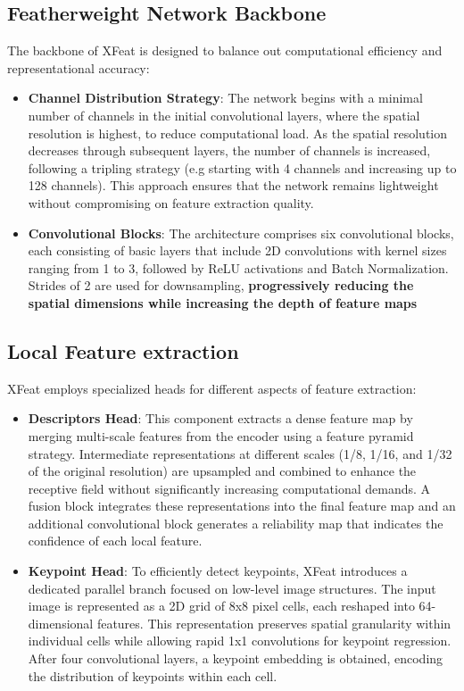 \subsection{Featherweight Network Backbone}
The backbone of XFeat is designed to balance out computational efficiency and
representational accuracy:
\begin{itemize}
    \item \textbf{Channel Distribution Strategy}: The network begins with a minimal number of channels in the initial convolutional layers, where the spatial resolution is highest, to reduce computational load. As the spatial resolution decreases through subsequent layers, the number of channels is increased, following a tripling strategy (e.g starting with 4 channels and increasing up to 128 channels). This approach ensures that the network remains lightweight without compromising on feature extraction quality.
    \item \textbf{Convolutional Blocks}: The architecture comprises six convolutional blocks, each consisting of basic layers that include 2D convolutions  with kernel sizes ranging from 1 to 3, followed by ReLU activations and Batch Normalization. Strides of 2 are used for downsampling, \textbf{progressively reducing the spatial dimensions while increasing the depth of feature maps}
\end{itemize}
\subsection{Local Feature extraction}
XFeat employs specialized heads for different aspects of feature extraction:
\begin{itemize}
    \item \textbf{Descriptors Head}: This component extracts a dense feature map by merging multi-scale features from the encoder using a feature pyramid strategy. Intermediate representations at different scales (1/8, 1/16, and 1/32 of the original resolution) are upsampled and combined to enhance the receptive field without significantly increasing computational demands. A fusion block integrates these representations into the final feature map and an additional convolutional block generates a reliability map that indicates the confidence of each local feature.
    \item \textbf{Keypoint Head}: To efficiently detect keypoints, XFeat introduces a dedicated parallel branch focused on low-level image structures. The input image is represented as a 2D grid of 8x8 pixel  cells, each reshaped into 64-dimensional features. This representation preserves spatial granularity within individual cells while allowing rapid 1x1 convolutions for keypoint regression. After four convolutional layers, a keypoint embedding is obtained, encoding the distribution of keypoints within each cell.
\end{itemize}
